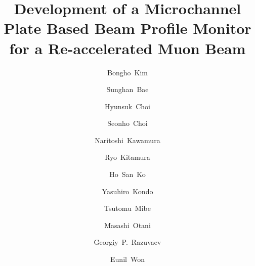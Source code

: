 \documentclass[preprint,3p,twocolumn]{elsarticle}
\begin{document}
\begin{frontmatter}

\title{ Development of a Microchannel Plate Based Beam Profile Monitor for a Re-accelerated Muon Beam}


\author[mymainaddress,mymainaddress1]{Bongho~Kim}
\author[mymainaddress,mymainaddress1]{Sunghan~Bae}
\author[mymainaddress,mymainaddress1]{Hyunsuk~Choi}
\author[mymainaddress,mymainaddress1]{Seonho~Choi}
\author[fifthaddress,fifthaddress1]{Naritoshi~Kawamura}
\author[secondaddress]{Ryo~Kitamura}
\author[mymainaddress,mymainaddress1]{Ho~San~Ko}
\author[seventhaddress]{Yasuhiro~Kondo}
\author[thirdaddress]{Tsutomu~Mibe}
\author[thirdaddress]{Masashi~Otani}
\author[fourthaddress,fourthaddress1,pulkovo]{Georgiy~P.~Razuvaev}
\author[sixthaddress]{Eunil~Won}
\address[mymainaddress]{Department of Physics and Astronomy, Seoul National University, Seoul, 08826, Korea}
\address[mymainaddress1]{Institute for Nuclear and Particle Astrophysics, Seoul National University, Seoul, 08826, Korea}
\address[secondaddress]{Department of Physics, University of Tokyo, Tokyo 113-0033, Japan}
\address[thirdaddress]{High Energy Accelerator Research Organization (KEK), Tsukuba 305-0801, Japan}
\address[fourthaddress]{Budker Institute of Nuclear Physics SB RAS, Novosibirsk 630090, Russia}
\address[fourthaddress1]{Novosibirsk State University, Novosibirsk 630090, Russia}
\address[pulkovo]{Pulkovo Observatory, St. Petersburg, 196140, Russia}
\address[fifthaddress]{Muon Sci. Lab., Institute of Materials Structure Science, High Accelerator Research Organization, Tsukuba, 305-0801, Japan}
\address[fifthaddress1]{Muon Sci. Sec., Materials and Life Science Facility, J-PARC, Tokai, 319-1195, Japan}
\address[sixthaddress]{Department of Physics, Korea University, Seoul, 02841, Korea}
\address[seventhaddress]{Japan Atomic Energy Agency (JAEA), Tokai, 319-1195, Japan}


\end{frontmatter}
\end{document}
